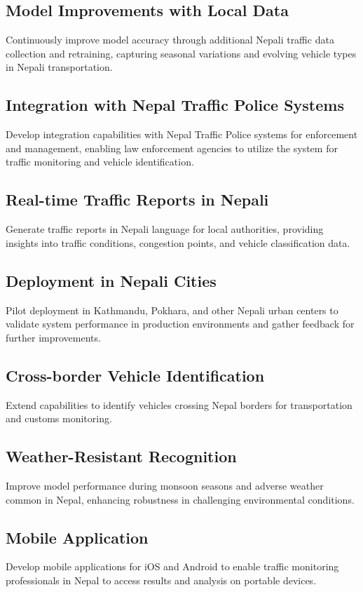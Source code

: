 \documentclass[12pt,a4paper]{report}
\begin{document}
\subsection{Model Improvements with Local Data}
Continuously improve model accuracy through additional Nepali traffic data collection and retraining, capturing seasonal variations and evolving vehicle types in Nepali transportation.

\subsection{Integration with Nepal Traffic Police Systems}
Develop integration capabilities with Nepal Traffic Police systems for enforcement and management, enabling law enforcement agencies to utilize the system for traffic monitoring and vehicle identification.

\subsection{Real-time Traffic Reports in Nepali}
Generate traffic reports in Nepali language for local authorities, providing insights into traffic conditions, congestion points, and vehicle classification data.

\subsection{Deployment in Nepali Cities}
Pilot deployment in Kathmandu, Pokhara, and other Nepali urban centers to validate system performance in production environments and gather feedback for further improvements.

\subsection{Cross-border Vehicle Identification}
Extend capabilities to identify vehicles crossing Nepal borders for transportation and customs monitoring.

\subsection{Weather-Resistant Recognition}
Improve model performance during monsoon seasons and adverse weather common in Nepal, enhancing robustness in challenging environmental conditions.

\subsection{Mobile Application}
Develop mobile applications for iOS and Android to enable traffic monitoring professionals in Nepal to access results and analysis on portable devices.
\end{document}

